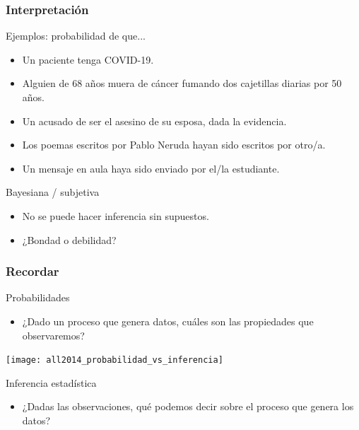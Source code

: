 \documentclass[table]{beamer}
\begin{document}
\begin{frame}
    \frametitle{Interpretación}
    \begin{block}{Ejemplos: probabilidad de que...}
        \begin{itemize}
            \item Un paciente tenga COVID-19.
            \item Alguien de 68 años muera de cáncer fumando dos cajetillas diarias por 50 años.
            \item Un acusado de ser el asesino de su esposa, dada la evidencia.
            \item Los poemas escritos por Pablo Neruda hayan sido escritos por otro/a.
            \item Un mensaje en aula haya sido enviado por el/la estudiante.
        \end{itemize}
    \end{block}
    \begin{block}{Bayesiana / subjetiva}
        \begin{itemize}
            \item No se puede hacer inferencia sin supuestos.
            \item ¿Bondad o debilidad?
        \end{itemize}
    \end{block}
\end{frame}

\begin{frame}
    \frametitle{Recordar}
    \begin{block}{Probabilidades}
        \begin{itemize}
            \item ¿Dado un proceso que genera datos, cuáles son las propiedades que observaremos?
        \end{itemize}
    \end{block}
    \begin{center}
        \texttt{[image: all2014\_probabilidad\_vs\_inferencia]}
    \end{center}
    \begin{block}{Inferencia estadística}
        \begin{itemize}
            \item ¿Dadas las observaciones, qué podemos decir sobre el proceso que genera los datos?
        \end{itemize}
    \end{block}
\end{frame}
\end{document}
